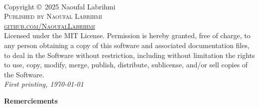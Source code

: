 \documentclass[11pt,%
	fleqn,%
	a4paper,%
	twoside%
]{backagBook}
\begin{document}
{
    }



\thispagestyle{empty}

~\vfill %

\noindent Copyright \copyright\ 2025 Naoufal Labrihmi\\ %
\noindent \textsc{Published by Naoufal Labrihmi}\\ %
\noindent \textsc{\href{https://github.com/NaoufalLabrihmi}{github.com/NaoufalLabrihmi}}\\ %
\noindent Licensed under the MIT License. Permission is hereby granted, free of charge, to any person obtaining a copy of this software and associated documentation files, to deal in the Software without restriction, including without limitation the rights to use, copy, modify, merge, publish, distribute, sublicense, and/or sell copies of the Software.\\ %
\noindent \textit{First printing, \today} %


\clearpage %
\thispagestyle{empty}

\begin{center}
    \vspace*{2cm}
    {\LARGE\bfseries\sffamily\color{primary}Remerciements}\par
    \vspace{1.5cm}
\end{center}
\end{document}
